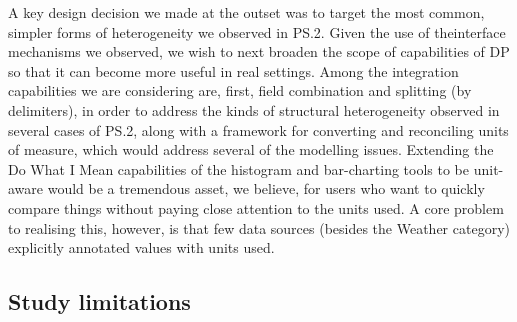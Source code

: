 \documentclass{sigchi}
\begin{document}
A key design decision we made at the outset was to target the most common, simpler forms of heterogeneity we observed in PS.2.  Given the use of theinterface mechanisms we observed, we wish to next broaden the scope of capabilities of DP so that it can become more useful in real settings.  Among the integration capabilities we are considering are, first, field combination and splitting (by delimiters), in order to address the kinds of structural heterogeneity observed in several cases of PS.2, along with a framework for converting and reconciling units of measure, which would address several of the modelling issues.  Extending the Do What I Mean capabilities of the histogram and bar-charting tools to be unit-aware would be a tremendous asset, we believe, for users who want to quickly compare things without paying close attention to the units used.  A core problem to realising this, however, is that few data sources (besides the Weather category) explicitly annotated values with units used.  

\subsection{Study limitations}





\end{document}
